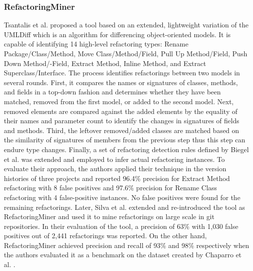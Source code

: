 \documentclass[letterpaper,12pt,onecolumn,final]{report}
\begin{document}
\subsubsection{RefactoringMiner}
Tsantalis et al. \cite{Tsantalis2013} proposed a tool based on an extended, lightweight variation of the UMLDiff \cite{Xing2005} which is an algorithm for differencing object-oriented models. It is capable of identifying 14 high-level refactoring types: Rename Package/Class/Method, Move Class/Method/Field, Pull Up Method/Field, Push Down Method/-Field, Extract Method, Inline Method, and Extract Superclass/Interface. The process identifies refactorings between two models in several rounds. First, it compares the names or signatures of classes, methods, and fields in a top-down fashion and determines whether they have been matched, removed from the first model, or added to the second model. Next, removed elements are compared against the added elements by the equality of their names and parameter count to identify the changes in signatures of fields and methods. Third, the leftover removed/added classes are matched based on the similarity of signatures of members from the previous step thus this step can endure type changes. Finally, a set of refactoring detection rules defined by Biegel et al. \cite{Biegel2001} was extended and employed to infer actual refactoring instances. To evaluate their approach, the authors applied their technique in the version histories of three projects and reported 96.4\% precision for Extract Method refactoring with 8 false positives and 97.6\% precision for Rename Class refactoring with 4 false-positive instances. No false positives were found for the remaining refactorings. Later, Silva et al. \cite{Silva2016} extended and re-introduced the tool as RefactoringMiner and used it to mine refactorings on large scale in git repositories. In their evaluation of the tool, a precision of 63\% with 1,030 false positives out of 2,441 refactorings was reported. On the other hand, RefactoringMiner achieved precision and recall of 93\% and 98\% respectively when the authors evaluated it as a benchmark on the dataset created by Chaparro et al. \cite{Chaparro2014}.
\end{document}
